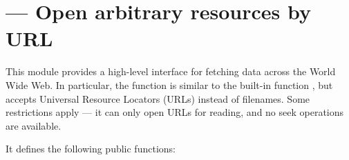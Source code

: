 \section{ ---
         Open arbitrary resources by URL}




This module provides a high-level interface for fetching data across
the World Wide Web.  In particular, the  function
is similar to the built-in function , but accepts
Universal Resource Locators (URLs) instead of filenames.  Some
restrictions apply --- it can only open URLs for reading, and no seek
operations are available.

It defines the following public functions:

